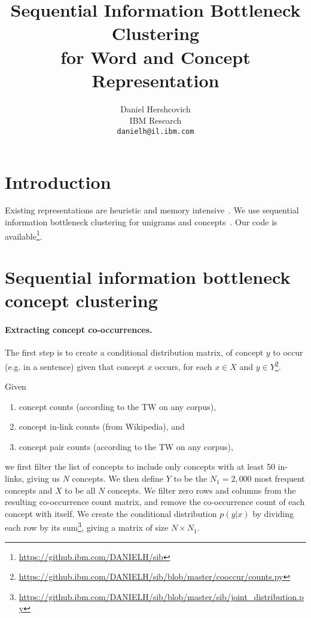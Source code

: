 \documentclass{article}
\title{Sequential Information Bottleneck Clustering \\
       for Word and Concept Representation}
\author{
Daniel Hershcovich \\
IBM Research\\
\texttt{danielh@il.ibm.com} \\
}
\begin{document}
    \maketitle

    \begin{abstract}
    \end{abstract}

    \section{Introduction}\label{sec:introduction}

    Existing representations are heuristic and memory intensive~\cite{mikolov2013efficient,pennington2014glove}.
    We use sequential information bottleneck clustering for unigrams and concepts~\cite{slonim2000document}.
    Our code is available\footnote{\url{https://github.ibm.com/DANIELH/sib}}.

    \section{Sequential information bottleneck concept clustering}\label{sec:clustering}

    \paragraph{Extracting concept co-occurrences.}

    The first step is to create a conditional distribution matrix,
    of concept $y$ to occur (e.g. in a sentence) given that concept $x$ occurs, for each
    $x\in X$ and
    $y\in Y$\footnote{\url{https://github.ibm.com/DANIELH/sib/blob/master/cooccur/counts.py}}.

    Given
    \begin{enumerate}
        \item concept counts (according to the TW on any corpus),
        \item concept in-link counts (from Wikipedia), and
        \item concept pair counts (according to the TW on any corpus),
    \end{enumerate}
    we first filter the list of concepts to include only concepts with at least 50
    in-links,
    giving us $N$ concepts.
    We then define $Y$ to be the $N_1=2,000$ most frequent concepts
    and $X$ to be all $N$ concepts.
    We filter zero rows and columns from the resulting co-occurrence count matrix,
    and remove the co-occurrence count of each concept with itself.
    We create the conditional distribution $p(y|x)$ by dividing each row by its
    sum\footnote{\url{https://github.ibm.com/DANIELH/sib/blob/master/sib/joint_distribution.py}},
    giving a matrix of size $N\times N_1$.
\end{document}
